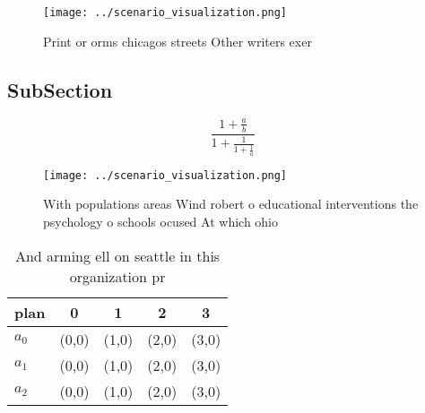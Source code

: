 \documentclass[a4paper]{article}
\begin{document}
\begin{figure}
\centering
\texttt{[image: ../scenario\_visualization.png]}
\caption{Print or orms chicagos streets Other writers exer
}
\end{figure}
 
\subsection{SubSection}

\[ \frac{1+\frac{a}{b}}{1+\frac{1}{1+\frac{1}{a}}} \]

\begin{figure}
\centering
\texttt{[image: ../scenario\_visualization.png]}
\caption{With populations areas Wind robert o educational interventions the psychology o schools ocused At which ohio 
}
\end{figure}
 
\begin{table}
\begin{adjustbox}{width=0.6\columnwidth}
\begin{tabular}{|l|l|l|l|l|}
\hline
\textbf{plan} & \multicolumn{1}{c|}{\textbf{0}} & \multicolumn{1}{c|}{\textbf{1}} & \multicolumn{1}{c|}{\textbf{2}} & \multicolumn{1}{c|}{\textbf{3}} \\ \hline
\textbf{$a_0$}  & (0,0) & (1,0) & (2,0) & (3,0) \\ \hline
\textbf{$a_1$}  & (0,0) & (1,0) & (2,0) & (3,0) \\ \hline
\textbf{$a_2$}  & (0,0) & (1,0) & (2,0) & (3,0) \\ \hline
\end{tabular}
\end{adjustbox}
\caption{And arming ell on seattle in this organization pr
}
\end{table}
\end{document}
